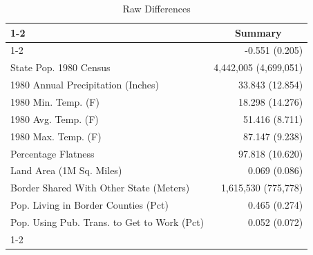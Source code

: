 \begin{table}[!h]
\caption{Raw Differences}
\centering
\begin{tabular}{ll}
\cline{1-2}
\multicolumn{1}{r}{} &
  \multicolumn{1}{c}{Summary} \\
\cline{1-2}
\multicolumn{1}{l}{Elasticity (Table 9)} &
  \multicolumn{1}{r}{-0.551 (0.205)} \\
\multicolumn{1}{l}{State Pop. 1980 Census} &
  \multicolumn{1}{r}{4,442,005 (4,699,051)} \\
\multicolumn{1}{l}{1980 Annual Precipitation (Inches)} &
  \multicolumn{1}{r}{33.843 (12.854)} \\
\multicolumn{1}{l}{1980 Min. Temp. (F)} &
  \multicolumn{1}{r}{18.298 (14.276)} \\
\multicolumn{1}{l}{1980 Avg. Temp. (F)} &
  \multicolumn{1}{r}{51.416 (8.711)} \\
\multicolumn{1}{l}{1980 Max. Temp. (F)} &
  \multicolumn{1}{r}{87.147 (9.238)} \\
\multicolumn{1}{l}{Percentage Flatness} &
  \multicolumn{1}{r}{97.818 (10.620)} \\
\multicolumn{1}{l}{Land Area (1M Sq. Miles)} &
  \multicolumn{1}{r}{0.069 (0.086)} \\
\multicolumn{1}{l}{Border Shared With Other State (Meters)} &
  \multicolumn{1}{r}{1,615,530 (775,778)} \\
\multicolumn{1}{l}{Pop. Living in Border Counties (Pct)} &
  \multicolumn{1}{r}{0.465 (0.274)} \\
\multicolumn{1}{l}{Pop. Using Pub. Trans. to Get to Work (Pct)} &
  \multicolumn{1}{r}{0.052 (0.072)} \\
\cline{1-2}
\end{tabular}
\end{table}

